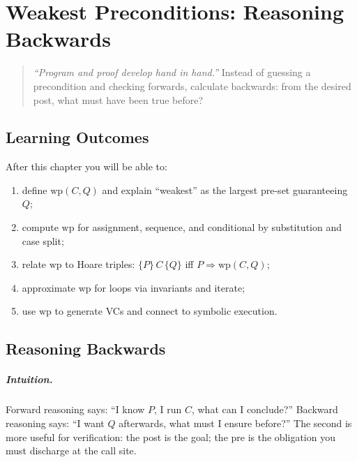\chapter{Weakest Preconditions: Reasoning Backwards}
\label{ch:wp}

\begin{quote}
\emph{``Program and proof develop hand in hand.''} Instead of guessing a precondition and checking forwards, calculate backwards: from the desired post, what must have been true before?
\end{quote}

\noindent{}
\vspace{0.4em}

\section*{Learning Outcomes}
After this chapter you will be able to:
\begin{enumerate}[label=(L\arabic*)]
    \item define $\text{wp}(C,Q)$ and explain ``weakest'' as the largest pre-set guaranteeing $Q$;
    \item compute $\text{wp}$ for assignment, sequence, and conditional by substitution and case split;
    \item relate $\text{wp}$ to Hoare triples: $\{P\}\,C\,\{Q\}$ iff $P\Rightarrow\text{wp}(C,Q)$;
    \item approximate $\text{wp}$ for loops via invariants and iterate;
    \item use $\text{wp}$ to generate VCs and connect to symbolic execution.
\end{enumerate}

\section{Reasoning Backwards}
\label{sec:backwards}
\paragraph{Intuition.} Forward reasoning says: ``I know $P$, I run $C$, what can I conclude?'' Backward reasoning says: ``I want $Q$ afterwards, what must I ensure before?'' The second is more useful for verification: the post is the goal; the pre is the obligation you must discharge at the call site.

